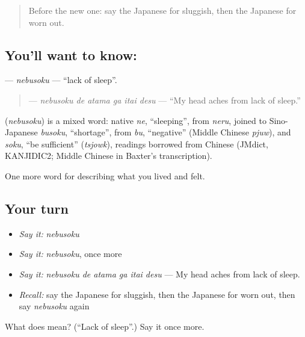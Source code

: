 \label{lesson:JA-C447-nebusoku}



\begin{quote}
Before the new one: say the Japanese for sluggish, then the Japanese for worn out.
\end{quote}

\subsection*{You'll want to know: }
\textbf{} — \emph{nebusoku} — \textquotedblleft{}lack of sleep\textquotedblright{}.

\begin{quote}
\textbf{  } — \emph{nebusoku de atama ga itai desu} — \textquotedblleft{}My head aches from lack of sleep.\textquotedblright{}
\end{quote}

\begin{cousinweb}
\textbf{} (\emph{nebusoku}) is a mixed word: native \emph{ne}, \textquotedblleft{}sleeping\textquotedblright{}, from \emph{neru}, joined to Sino-Japanese \emph{busoku}, \textquotedblleft{}shortage\textquotedblright{}, from \emph{bu}, \textquotedblleft{}negative\textquotedblright{} (Middle Chinese \emph{pjuw}), and \emph{soku}, \textquotedblleft{}be sufficient\textquotedblright{} (\emph{tsjowk}), readings borrowed from Chinese (JMdict, KANJIDIC2; Middle Chinese in Baxter's transcription).
\end{cousinweb}

\begin{grammarlens}[title={What you've built}]
One more word for describing what you lived and felt.
\end{grammarlens}

\subsection*{Your turn}
\begin{itemize}
\raggedright
  \item \emph{Say it:} \emph{nebusoku}
  \item \emph{Say it:} \emph{nebusoku}, once more
  \item \emph{Say it:} \emph{nebusoku de atama ga itai desu} — My head aches from lack of sleep.
  \item \emph{Recall:} say the Japanese for sluggish, then the Japanese for worn out, then say \emph{nebusoku} again
\end{itemize}

\begin{tcolorbox}[breakable,colback=teal!4,colframe=teal!35!black,title={Before you move on}]
What does  mean? (\textquotedblleft{}Lack of sleep\textquotedblright{}.) Say it once more.
\end{tcolorbox}
